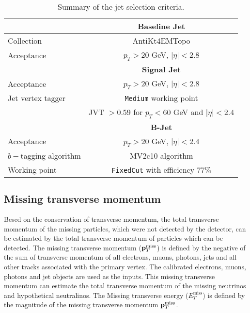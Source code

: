 \begin{table}[htbp]
\begin{center}
\begin{tabular}{|l|c|}
\hline
\hline
& \textbf{Baseline Jet} \\
\hline
\hline
Collection     & AntiKt4EMTopo \\
\hline
Acceptance     & $p_T > 20$ GeV, $|\eta| < 2.8$ \\
\hline
\hline
& \textbf{Signal Jet} \\
\hline
\hline
Acceptance     & $p_T > 20$ GeV, $|\eta | < 2.8$ \\
\hline
Jet vertex tagger  &  \texttt{Medium} working point\\
&  JVT $> 0.59$ for $p_T < 60$ GeV and $|\eta| < 2.4$\\
\hline
\hline
& \textbf{B-Jet} \\
\hline
\hline
Acceptance     & $p_T > 20$ GeV, $|\eta| < 2.4$ \\
\hline
$b-$tagging algorithm &  MV2c10 algorithm \\
Working point & \texttt{FixedCut} with efficiency 77\% \\
\hline
\end{tabular}
\end{center}
\caption{Summary of the jet selection criteria.}
\label{tab:jetsdef}
\end{table}

\subsection{Missing transverse momentum}
Besed on the conservation of transverse momentum, the total transverse momentum of the missing particles,  which were not detected by the detector, can be estimated by the total transverse momentum of particles which can be detected.
The missing transverse momentum (${\bf p}_T^{\text{miss}}$) is defined by the negative of the sum of transverse momentum of all electrons, muons, photons, jets and all other tracks associated with the primary vertex.
The calibrated electrons, muons, photons and jet objects are used as the inputs.
This missing transverse momentum can estimate the total transverse momentum of the missing neutrinos and hypothetical neutralinos.
The Missing transverse energy ($E_{T}^{\text{miss}}$) is defined by the magnitude of the missing transverse momentum ${\bf p}_T^{\text{miss}}$.

